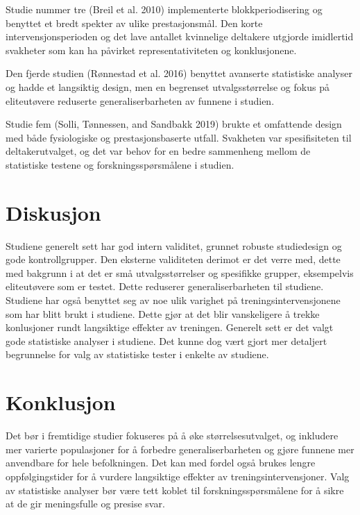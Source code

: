 \documentclass[
  letterpaper,
  DIV=11,
  numbers=noendperiod]{scrreprt}
\begin{document}
Studie nummer tre (Breil et al. 2010) implementerte blokkperiodisering
og benyttet et bredt spekter av ulike prestasjonsmål. Den korte
intervensjonsperioden og det lave antallet kvinnelige deltakere utgjorde
imidlertid svakheter som kan ha påvirket representativiteten og
konklusjonene.

Den fjerde studien (Rønnestad et al. 2016) benyttet avanserte
statistiske analyser og hadde et langsiktig design, men en begrenset
utvalgsstørrelse og fokus på eliteutøvere reduserte generaliserbarheten
av funnene i studien.

Studie fem (Solli, Tønnessen, and Sandbakk 2019) brukte et omfattende
design med både fysiologiske og prestasjonsbaserte utfall. Svakheten var
spesifisiteten til deltakerutvalget, og det var behov for en bedre
sammenheng mellom de statistiske testene og forskningsspørsmålene i
studien.

\section{Diskusjon}\label{diskusjon-4}

Studiene generelt sett har god intern validitet, grunnet robuste
studiedesign og gode kontrollgrupper. Den eksterne validiteten derimot
er det verre med, dette med bakgrunn i at det er små utvalgsstørrelser
og spesifikke grupper, eksempelvis eliteutøvere som er testet. Dette
reduserer generaliserbarheten til studiene. Studiene har også benyttet
seg av noe ulik varighet på treningsintervensjonene som har blitt brukt
i studiene. Dette gjør at det blir vanskeligere å trekke konlusjoner
rundt langsiktige effekter av treningen. Generelt sett er det valgt gode
statistiske analyser i studiene. Det kunne dog vært gjort mer detaljert
begrunnelse for valg av statistiske tester i enkelte av studiene.

\section{Konklusjon}\label{konklusjon}

Det bør i fremtidige studier fokuseres på å øke størrelsesutvalget, og
inkludere mer varierte populasjoner for å forbedre generaliserbarheten
og gjøre funnene mer anvendbare for hele befolkningen. Det kan med
fordel også brukes lengre oppfølgingstider for å vurdere langsiktige
effekter av treningsintervensjoner. Valg av statistiske analyser bør
være tett koblet til forskningsspørsmålene for å sikre at de gir
meningsfulle og presise svar.
\end{document}
